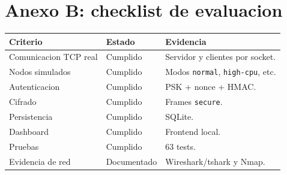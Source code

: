 \documentclass[11pt,letterpaper]{article}
\begin{document}
\section{Anexo B: checklist de evaluacion}

\begin{longtable}{|p{}|p{}|p{}|}
\hline
\textbf{Criterio} & \textbf{Estado} & \textbf{Evidencia} \\
\hline
Comunicacion TCP real & Cumplido & Servidor y clientes por socket. \\
\hline
Nodos simulados & Cumplido & Modos \texttt{normal}, \texttt{high-cpu}, etc. \\
\hline
Autenticacion & Cumplido & PSK + nonce + HMAC. \\
\hline
Cifrado & Cumplido & Frames \texttt{secure}. \\
\hline
Persistencia & Cumplido & SQLite. \\
\hline
Dashboard & Cumplido & Frontend local. \\
\hline
Pruebas & Cumplido & 63 tests. \\
\hline
Evidencia de red & Documentado & Wireshark/tshark y Nmap. \\
\hline
\end{longtable}
\end{document}
